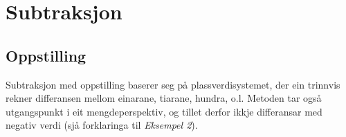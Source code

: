 \section{Subtraksjon}
\subsection{Oppstilling}
Subtraksjon med oppstilling baserer seg på plassverdisystemet, der ein trinnvis rekner differansen mellom einarane, tiarane, hundra, o.l. Metoden tar også utgangspunkt i eit mengdeperspektiv, og tillet derfor ikkje differansar med negativ verdi (sjå forklaringa til \textsl{Eksempel 2}).
\begin{center}
	\parbox{0.3\linewidth}{
} \qquad
\parbox{0.3\linewidth}{
} \\[12pt]
\parbox{0.3\linewidth}{
}\qquad
\parbox{0.3\linewidth}{
}

\end{center}
